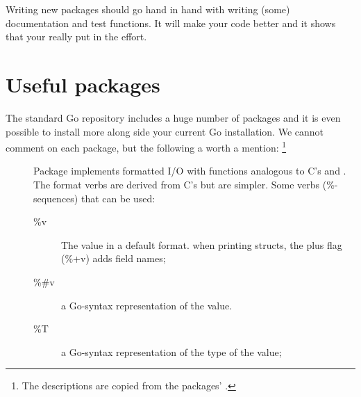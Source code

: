 \begin{lbar}
Writing new packages should go hand in hand with writing (some)
documentation and test functions. It will make your code better and it
shows that your really put in the effort.
\end{lbar}

\section{Useful packages}
The standard Go repository includes a huge number of packages and it is
even possible to install more along side your current Go installation. 
We cannot comment on each package, but the following a worth a mention:
\footnote{The descriptions are copied from the packages' .}

\begin{description}
\item[]{
Package  implements formatted I/O with functions analogous
to C's  and . The format verbs are derived
from C's but are simpler. Some verbs (\%-sequences) that can be used:

\begin{description}
\item[\%v]{The value in a default format.
when printing structs, the plus flag (\%+v) adds field names;}
\item[\%\#v]{a Go-syntax representation of the value.}
\item[\%T]{a Go-syntax representation of the type of the value;}
\end{description}

}


\end{description}
